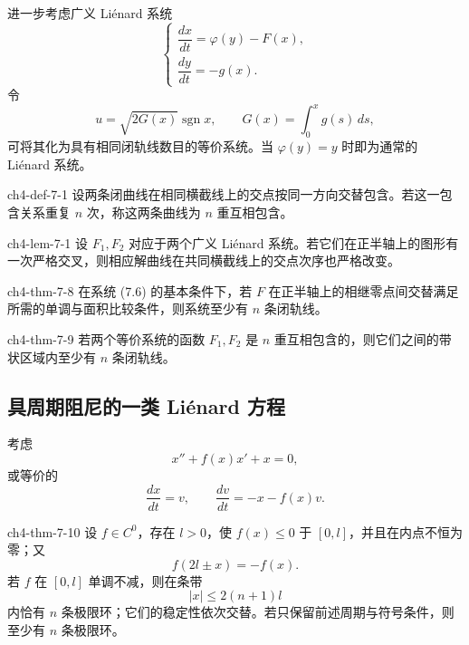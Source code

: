 
进一步考虑广义 Liénard 系统
\[
\begin{cases}
\dfrac{dx}{dt}=\varphi(y)-F(x),\\
\dfrac{dy}{dt}=-g(x).
\end{cases}\tag{7.6}
\]
令
\[
u=\sqrt{2G(x)}\operatorname{sgn}x,\qquad
G(x)=\int_0^x g(s)\,ds,
\]
可将其化为具有相同闭轨线数目的等价系统。当 $\varphi(y)=y$ 时即为通常的 Liénard 系统。

\begin{definition}{ }{ch4-def-7-1}
设两条闭曲线在相同横截线上的交点按同一方向交替包含。若这一包含关系重复 $n$ 次，称这两条曲线为 $n$ 重互相包含。
\end{definition}


\begin{lemma}{}{ch4-lem-7-1}
设 $F_1,F_2$ 对应于两个广义 Liénard 系统。若它们在正半轴上的图形有一次严格交叉，则相应解曲线在共同横截线上的交点次序也严格改变。
\end{lemma}

\begin{theorem}{}{ch4-thm-7-8}
在系统 (7.6) 的基本条件下，若 $F$ 在正半轴上的相继零点间交替满足所需的单调与面积比较条件，则系统至少有 $n$ 条闭轨线。
\end{theorem}

\begin{theorem}{}{ch4-thm-7-9}
若两个等价系统的函数 $F_1,F_2$ 是 $n$ 重互相包含的，则它们之间的带状区域内至少有 $n$ 条闭轨线。
\end{theorem}


\subsection*{具周期阻尼的一类 Liénard 方程}

考虑
\[
x''+f(x)x'+x=0,
\]
或等价的
\[
\dfrac{dx}{dt}=v,\qquad \dfrac{dv}{dt}=-x-f(x)v.
\]

\begin{theorem}{}{ch4-thm-7-10}
设 $f\in C^0$，存在 $l>0$，使 $f(x)\leqslant0$ 于 $[0,l]$，并且在内点不恒为零；又
\[
f(2l\pm x)=-f(x).
\]
若 $f$ 在 $[0,l]$ 单调不减，则在条带
\[
|x|\leqslant2(n+1)l
\]
内恰有 $n$ 条极限环；它们的稳定性依次交替。若只保留前述周期与符号条件，则至少有 $n$ 条极限环。
\end{theorem}

